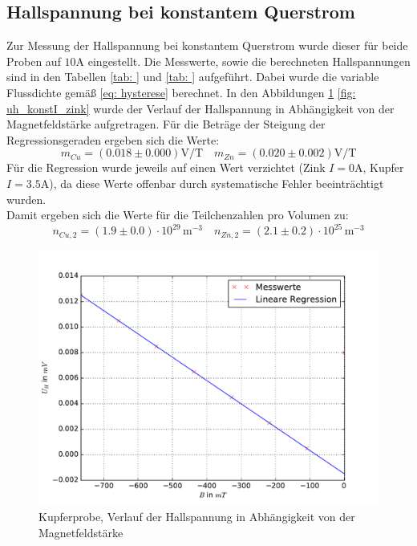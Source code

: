 \subsection{Hallspannung bei konstantem Querstrom}
Zur Messung der Hallspannung bei konstantem Querstrom wurde dieser für beide Proben auf $10\si{\ampere}$ eingestellt. Die
Messwerte, sowie die berechneten Hallspannungen sind in den Tabellen \ref{tab: } und \ref{tab: } aufgeführt. Dabei wurde
die variable Flussdichte gemäß \eqref{eq: hysterese} berechnet. In den Abbildungen \ref{fig: uh_konstI_kupfer} \ref{fig: uh_konstI_zink}
wurde der Verlauf der Hallspannung in Abhängigkeit von der Magnetfeldstärke aufgretragen. Für die Beträge der Steigung der Regressionsgeraden
ergeben sich die Werte:
\begin{equation}
  m_{Cu} = (0.018 \pm 0.000)\si{\volt \per \tesla }  \quad m_{Zn} = (0.020 \pm 0.002)\si{\volt \per \tesla}
\end{equation}
Für die Regression wurde jeweils auf einen Wert verzichtet (Zink $I = 0 \si{\ampere}$, Kupfer $I = 3.5\si{\ampere}$), da diese Werte offenbar
durch systematische Fehler beeinträchtigt wurden.\\
Damit ergeben sich die Werte für die Teilchenzahlen pro Volumen zu:
\begin{equation}
  n_{Cu,2} = (1.9 \pm 0.0)\cdot 10^{29}\,\si{ \meter^{-3}} \quad n_{Zn,2} = (2.1\pm 0.2)\cdot 10^{25}\,\si{ \meter^{-3}}
\end{equation}


\begin{figure}
  \centering
  \includegraphics[width=\textwidth]{pics/u_h_kupfer_konstI.pdf}
  \caption{Kupferprobe, Verlauf der Hallspannung in Abhängigkeit von der Magnetfeldstärke}
  \label{fig: uh_konstI_kupfer}
\end{figure}

